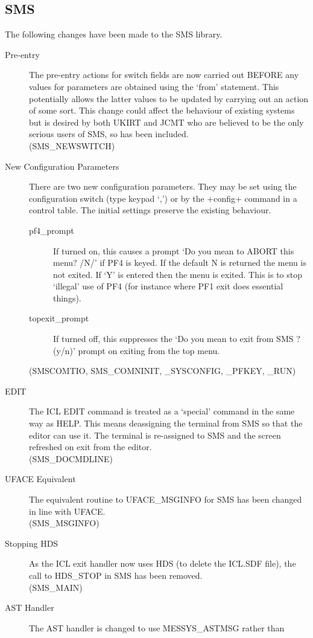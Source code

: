 \subsection{SMS}
The following changes have been made to the SMS library.
\begin{description}
\item[Pre-entry] The pre-entry actions for switch fields are now carried out
BEFORE any  values for parameters are obtained using the `from' statement.
This potentially allows the latter values to be updated by carrying out an
action of some sort.  This change could affect the behaviour of existing systems
but is desired by both UKIRT and JCMT who are believed to be the only serious
users of SMS, so has been included.\\
(SMS\_NEWSWITCH)
\item[New Configuration Parameters] There are two new configuration parameters.
They may be set using the configuration switch (type keypad `,') or by the
+config+ command in a control table. The initial settings preserve the existing
behaviour.
\begin{description}
\item[pf4\_prompt]
If turned on, this causes a prompt `Do you mean to ABORT this menu? /N/' if
PF4 is keyed.
If the default N is returned the menu is not exited. If `Y' is entered then
the menu is exited.  This is to stop `illegal' use of PF4 (for instance where
PF1 exit does essential things).
\item[topexit\_prompt] If turned off, this suppresses the `Do you mean to exit
from SMS ? (y/n)' prompt on exiting from the top menu.
\end{description}
(SMSCOMTIO, SMS\_COMNINIT, \_SYSCONFIG, \_PFKEY, \_RUN)
\item[EDIT] The ICL EDIT command is treated as a `special' command in the same
way as HELP. This means deassigning the terminal from SMS so that the editor
can use it. The terminal is re-assigned to SMS and the screen refreshed on
exit from the editor.\\
(SMS\_DOCMDLINE)
\item[UFACE Equivalent] The equivalent routine to UFACE\_MSGINFO for SMS has
been changed in line with UFACE.\\
(SMS\_MSGINFO)
\item[Stopping HDS] As the ICL exit handler now uses HDS (to delete the ICL.SDF
file), the call to HDS\_STOP in SMS has been removed.\\
(SMS\_MAIN)
\item[AST Handler] The AST handler is changed to use MESSYS\_ASTMSG rather than

\end{description}
